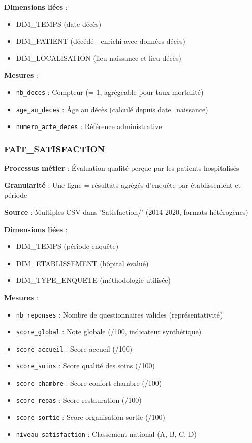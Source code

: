 \textbf{Dimensions liées} :
\begin{itemize}[leftmargin=*]
    \item DIM_TEMPS (date décès)
    \item DIM_PATIENT (décédé - enrichi avec données décès)
    \item DIM_LOCALISATION (lieu naissance et lieu décès)
\end{itemize}

\textbf{Mesures} :
\begin{itemize}[leftmargin=*]
    \item \texttt{nb_deces} : Compteur (= 1, agrégeable pour taux mortalité)
    \item \texttt{age_au_deces} : Âge au décès (calculé depuis date_naissance)
    \item \texttt{numero_acte_deces} : Référence administrative
\end{itemize}

\subsubsection{FAIT_SATISFACTION}

\textbf{Processus métier} : Évaluation qualité perçue par les patients hospitalisés

\textbf{Granularité} : Une ligne = résultats agrégés d'enquête par établissement et période

\textbf{Source} : Multiples CSV dans 'Satisfaction/' (2014-2020, formats hétérogènes)

\textbf{Dimensions liées} :
\begin{itemize}[leftmargin=*]
    \item DIM_TEMPS (période enquête)
    \item DIM_ETABLISSEMENT (hôpital évalué)
    \item DIM_TYPE_ENQUETE (méthodologie utilisée)
\end{itemize}

\textbf{Mesures} :
\begin{itemize}[leftmargin=*]
    \item \texttt{nb_reponses} : Nombre de questionnaires valides (représentativité)
    \item \texttt{score_global} : Note globale (/100, indicateur synthétique)
    \item \texttt{score_accueil} : Score accueil (/100)
    \item \texttt{score_soins} : Score qualité des soins (/100)
    \item \texttt{score_chambre} : Score confort chambre (/100)
    \item \texttt{score_repas} : Score restauration (/100)
    \item \texttt{score_sortie} : Score organisation sortie (/100)
    \item \texttt{niveau_satisfaction} : Classement national (A, B, C, D)
\end{itemize}

